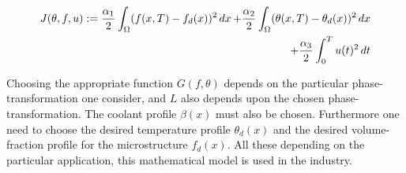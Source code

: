 \begin{equation*}
\begin{aligned}
        J(\theta, f, u) := \frac{\alpha_1}{2}\int_{\Omega}(f(x,T)-f_d(x))^2\mathop{dx} + \frac{\alpha_2}{2}\int_{\Omega}(\theta(x,T) - \theta_d(x))^2\mathop{dx} \\ + \frac{\alpha_3}{2}\int_0^Tu(t)^2 \mathop{dt}
\end{aligned}
\end{equation*}

Choosing the appropriate function $G(f,\theta)$ depends on the particular phase-transformation one consider, and $L$ also depends upon the chosen phase-transformation. The coolant profile $\beta(x)$ must also be chosen. Furthermore one need to choose the desired temperature profile $\theta_d(x)$ and the desired volume-fraction profile for the microstructure $f_d(x)$. All these depending on the particular application, this mathematical model is used in the industry. 